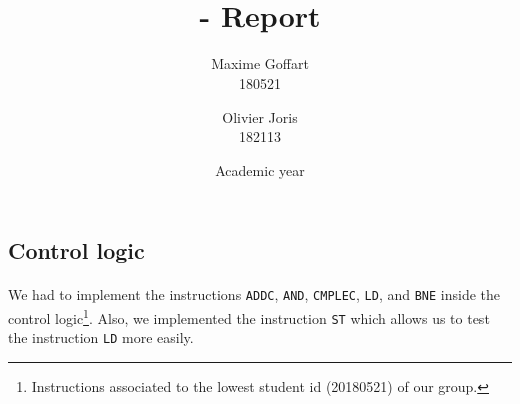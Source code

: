 \documentclass[a4paper, 10pt, oneside]{article}
\title{\ClassName\\\vspace*{0.8cm}\ProjectName - Report\vspace{1cm}}
\author{Maxime Goffart \\180521 \and Olivier Joris\\182113}
\date{\vspace{1cm}Academic year \AcademicYear}
\begin{document}
\begin{titlingpage}
{\let\newpage\relax\maketitle}
\end{titlingpage}

\thispagestyle{empty}
\newpage


\subsection*{Control logic}
\paragraph{}We had to implement the instructions \texttt{ADDC}, \texttt{AND}, \texttt{CMPLEC}, \texttt{LD}, and \texttt{BNE} inside the control logic\footnote{Instructions associated to the lowest student id (20180521) of our group.}. Also, we implemented the instruction \texttt{ST} which allows us to test the instruction \texttt{LD} more easily.\\ \newline
\end{document}
